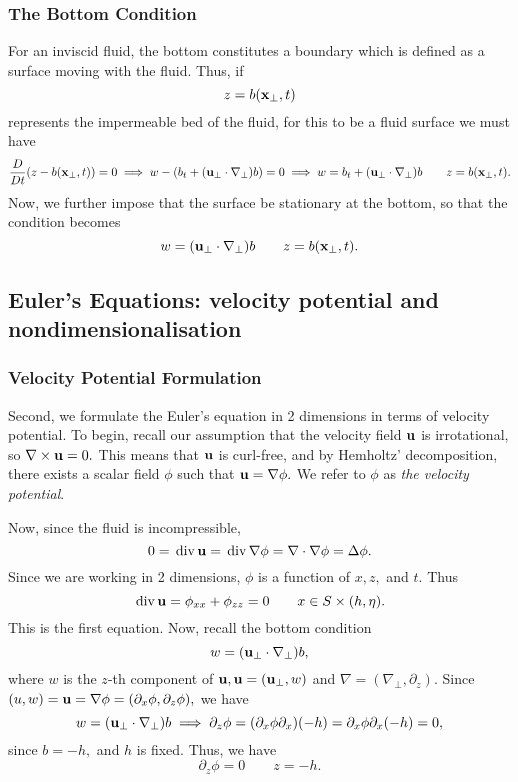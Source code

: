 \documentclass[10pt,reqno,oneside,a4paper]{article}
\begin{document}
\subsubsection*{The Bottom Condition}
For an inviscid fluid, the bottom constitutes a boundary which is defined as a surface moving with the fluid. Thus, if 
\[ 
z = b({\bf x}_\perp, t)
\]
represents the impermeable bed of the fluid, for this to be a fluid surface we must have 
\[ 
\frac{D}{Dt}(z -  b({\bf x}_{\perp}, t)) = 0 \implies w -( b_t + ({\bf u}_{\perp}\cdot \nabla_{\perp})b )= 0 \implies w =b_t + ({\bf u}_{\perp}\cdot \nabla_{\perp})b \qquad z = b({\bf x}_{\perp}, t).
\]
Now, we further impose that the surface be stationary at the bottom, so that the condition becomes
\[ 
w = ({\bf u}_{\perp}\cdot \nabla_{\perp})b \qquad z = b({\bf x}_{\perp}, t).
\]

\subsection{Euler's Equations: velocity potential and nondimensionalisation}

\subsubsection{Velocity Potential Formulation}
Second, we formulate the Euler's equation in 2 dimensions in terms of velocity potential. To begin, recall our assumption that the velocity field ${\bf u}$ is irrotational, so $\nabla \times {\bf u} = 0.$ This means that ${\bf u}$ is curl-free, and by Hemholtz' decomposition, there exists a scalar field $\phi$ such that ${\bf u} = \nabla \phi.$ We refer to $\phi$ as \emph{the velocity potential}. 

Now, since the fluid is incompressible, 
\[ 
0 = \,\mathrm{div}\, {\bf u} = \,\mathrm{div}\, \nabla \phi = \nabla \cdot \nabla \phi = \Delta \phi. 
\]
Since we are working in 2 dimensions, $\phi$ is a function of $x,z,$ and $t.$ Thus
\begin{equation}\label{EE-main}
\,\mathrm{div}\, {\bf u} = \phi_{xx} + \phi_{zz} = 0 \qquad x\in S\times (h, \eta).
\end{equation}
This is the first equation. Now, recall the bottom condition
\[ 
w = ({\bf u}_{\perp} \cdot \nabla_{\perp})b,
\]
where $w$ is the $z$-th component of ${\bf u}, {\bf u} = ({\bf u}_{\perp}, w)$ and $\nabla = (\nabla_{\perp}, \partial_z).$ Since $(u,w) = {\bf u} = \nabla \phi = (\partial_x \phi, \partial_z \phi),$ we have
\[ 
w = ({\bf u}_{\perp} \cdot \nabla_{\perp})b \implies \partial_z \phi = (\partial_x \phi  \partial_x)(-h) = \partial_x \phi \partial_x (-h) = 0,
\]
since $b = -h,$ and $h$ is fixed. Thus, we have 
\begin{equation}\label{EE-bottom}
\partial_z \phi = 0 \qquad z = -h.
\end{equation}
\end{document}
